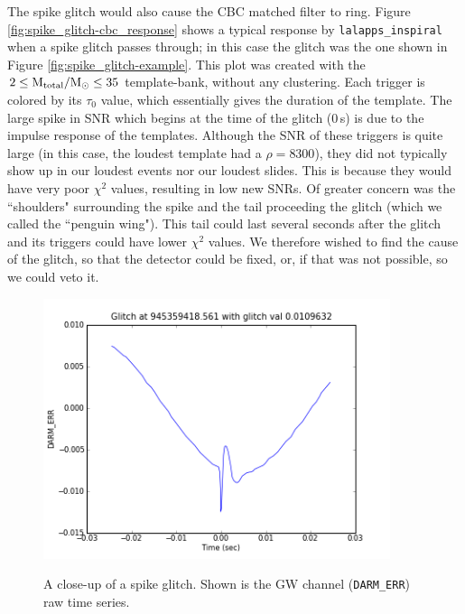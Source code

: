 The spike glitch would also cause the \ac{CBC} matched filter to ring. Figure \ref{fig:spike_glitch-cbc_response} shows a typical response by \verb|lalapps_inspiral| when a spike glitch passes through; in this case the glitch was the one shown in Figure \ref{fig:spike_glitch-example}. This plot was created with the $2 \leq \mathrm{M_{total}}/\mathrm{M_\odot} \leq 35$ template-bank, without any clustering. Each trigger is colored by its $\tau_0$ value, which essentially gives the duration of the template. The large spike in \ac{SNR} which begins at the time of the glitch ($0\,$s) is due to the impulse response of the templates. Although the \ac{SNR} of these triggers is quite large (in this case, the loudest template had a $\rho = 8300$), they did not typically show up in our loudest events nor our loudest slides. This is because they would have very poor $\chi^2$ values, resulting in low new \acp{SNR}. Of greater concern was the ``shoulders" surrounding the spike and the tail proceeding the glitch (which we called the ``penguin wing"). This tail could last several seconds after the glitch and its triggers could have lower $\chi^2$ values. We therefore wished to find the cause of the glitch, so that the detector could be fixed, or, if that was not possible, so we could veto it.

\begin{figure}[htb]
\center
\includegraphics[width=4in]{figures/spike_glitch/spike_glitch_example.png}
\label{fig:spike_glitch-closeup}
\caption{A close-up of a spike glitch. Shown is the \ac{GW} channel (\texttt{DARM\_ERR}) raw time series.}
\end{figure}

